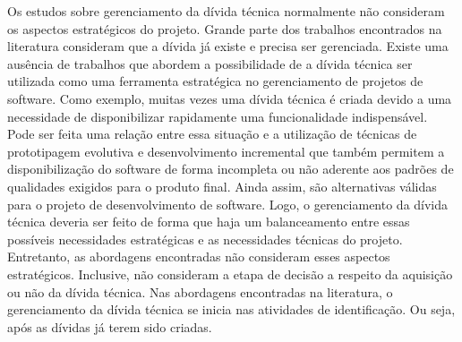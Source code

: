 Os estudos sobre gerenciamento da dívida técnica normalmente não consideram os aspectos estratégicos do projeto. Grande parte dos trabalhos encontrados na literatura consideram que a dívida já existe e precisa ser gerenciada. Existe uma ausência de trabalhos que abordem a possibilidade de a dívida técnica ser utilizada como uma ferramenta  estratégica no gerenciamento de projetos de software. Como exemplo, muitas vezes uma dívida técnica é criada devido a uma necessidade  de disponibilizar rapidamente uma funcionalidade indispensável.  Pode ser feita uma relação entre essa situação e a utilização de técnicas de prototipagem evolutiva e desenvolvimento incremental que também permitem a disponibilização do software de forma incompleta ou não aderente aos padrões de qualidades exigidos para o produto final. Ainda assim,   são alternativas válidas para o projeto de desenvolvimento de software.  Logo, o gerenciamento da dívida técnica deveria ser feito de forma que haja um balanceamento entre essas possíveis  necessidades estratégicas e as necessidades técnicas do projeto. Entretanto, as abordagens encontradas não consideram esses aspectos estratégicos. Inclusive, não consideram a etapa de decisão a respeito da aquisição ou não da dívida técnica. Nas abordagens encontradas na literatura\cite{seaman2011measuring,guo2011portfolio,fernandez2015analysis}, o gerenciamento da dívida técnica se inicia nas atividades de identificação. Ou seja, após as dívidas já terem sido criadas. 










